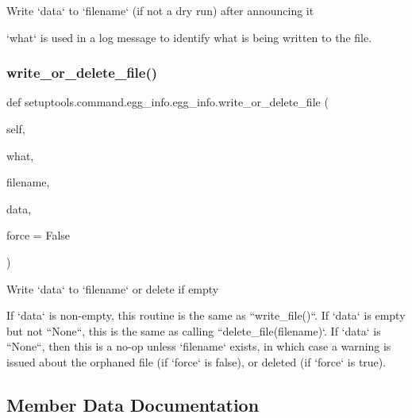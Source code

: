 \begin{DoxyVerb}Write `data` to `filename` (if not a dry run) after announcing it

`what` is used in a log message to identify what is being written
to the file.
\end{DoxyVerb}
 \mbox{\label{classsetuptools_1_1command_1_1egg__info_1_1egg__info_af70ce31ed5b38118ad41b3899f56f9b8}} 
\subsubsection{\texorpdfstring{write\+\_\+or\+\_\+delete\+\_\+file()}{write\_or\_delete\_file()}}
{\footnotesize\ttfamily def setuptools.\+command.\+egg\+\_\+info.\+egg\+\_\+info.\+write\+\_\+or\+\_\+delete\+\_\+file (\begin{DoxyParamCaption}\item[{}]{self,  }\item[{}]{what,  }\item[{}]{filename,  }\item[{}]{data,  }\item[{}]{force = {\ttfamily False} }\end{DoxyParamCaption})}

\begin{DoxyVerb}Write `data` to `filename` or delete if empty

If `data` is non-empty, this routine is the same as ``write_file()``.
If `data` is empty but not ``None``, this is the same as calling
``delete_file(filename)`.  If `data` is ``None``, then this is a no-op
unless `filename` exists, in which case a warning is issued about the
orphaned file (if `force` is false), or deleted (if `force` is true).
\end{DoxyVerb}
 

\subsection{Member Data Documentation}
\mbox{\label{classsetuptools_1_1command_1_1egg__info_1_1egg__info_a8c7d144bd4da0035c6bf2de95eaf7315}} 
